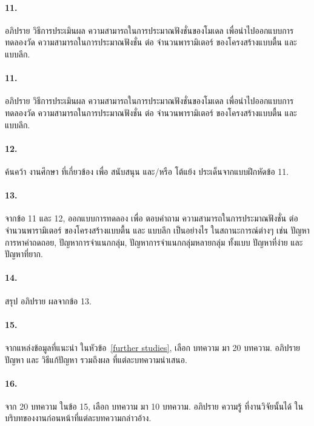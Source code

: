 \paragraph{11.}
อภิปราย วิธีการประเมินผล ความสามารถในการประมาณฟังชั่นของโมเดล เพื่อนำไปออกแบบการทดลองวัด ความสามารถในการประมาณฟังชั่น ต่อ จำนวนพารามิเตอร์ ของโครงสร้างแบบตื้น และ แบบลึก.

\paragraph{11.}
อภิปราย วิธีการประเมินผล ความสามารถในการประมาณฟังชั่นของโมเดล เพื่อนำไปออกแบบการทดลองวัด ความสามารถในการประมาณฟังชั่น ต่อ จำนวนพารามิเตอร์ ของโครงสร้างแบบตื้น และ แบบลึก.

\paragraph{12.} 
ค้นคว้า งานศึกษา ที่เกี่ยวข้อง เพื่อ สนับสนุน และ/หรือ โต้แย้ง ประเด็นจากแบบฝึกหัดข้อ 11.

\paragraph{13.} 
จากข้อ 11 และ 12, ออกแบบการทดลอง เพื่อ ตอบคำถาม ความสามารถในการประมาณฟังชั่น ต่อ จำนวนพารามิเตอร์ ของโครงสร้างแบบตื้น และ แบบลึก เป็นอย่างไร ในสถานะการณ์ต่างๆ เช่น ปัญหาการหาค่าถดถอย, ปัญหาการจำแนกกลุ่ม, ปัญหาการจำแนกกลุ่มหลายกลุ่ม ทั้งแบบ ปัญหาที่ง่าย และ ปัญหาที่ยาก.

\paragraph{14.} 
สรุป อภิปราย ผลจากข้อ 13.

\paragraph{15.} 
จากแหล่งข้อมูลที่แนะนำ ในหัวข้อ~\ref{further studies}, เลือก บทความ มา 20 บทความ.
อภิปราย ปัญหา และ วิธีแก้ปัญหา รวมถึงผล ที่แต่ละบทความนำเสนอ.

\paragraph{16.} 
จาก 20 บทความ ในข้อ 15, เลือก บทความ มา 10 บทความ.
อภิปราย ความรู้ ที่งานวิจัยนั้นได้ ในบริบทของงานก่อนหน้าที่แต่ละบทความกล่าวอ้าง.


